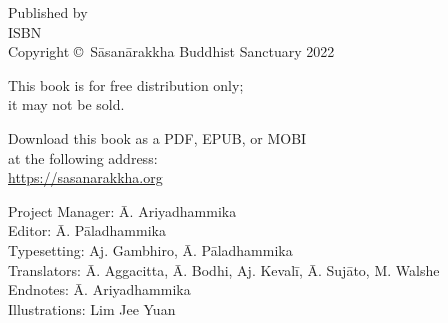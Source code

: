 \cleartoverso
\thispagestyle{empty}

\vspace*{-\baselineskip}

{%

  \ifafiveversion \fontsize{10}{16}\selectfont \fi
  \ifasixversion \fontsize{7.5}{11}\selectfont \fi
  \centering
  \setlength{\parindent}{0pt}%

  \ifafiveversion \vspace{0.5cm} \fi

  Published by \publisher\\
  ISBN \theISBN\\
  Copyright \copyright\ Sāsanārakkha Buddhist Sanctuary 2022

  \ifafiveversion \vspace{0.5cm} \fi
  \ifasixversion \vspace{0.4cm} \fi

  This book is for free distribution only;\\
  it may not be sold.


  \ifafiveversion \vspace{0.5cm} \fi
  \ifasixversion \vspace{0.4cm} \fi

  Download this book as a PDF, EPUB, or MOBI\\
  at the following address:\\
  \href{https://sasanarakkha.org/}{https://sasanarakkha.org}

  \ifafiveversion \vspace{0.5cm} \fi
  \ifasixversion \vspace{0.4cm} \fi

  Project Manager: Ā. Ariyadhammika\\
  Editor: Ā. Pāladhammika\\
  Typesetting: Aj. Gambhiro, Ā. Pāladhammika\\
  Translators: Ā. Aggacitta, Ā. Bodhi, Aj. Kevalī, Ā. Sujāto, M. Walshe\\
  Endnotes: Ā. Ariyadhammika\\
  Illustrations: Lim Jee Yuan



  \ifafiveversion \vspace{0.5cm} \fi
  \ifasixversion \vspace{0.4cm} \fi

}
